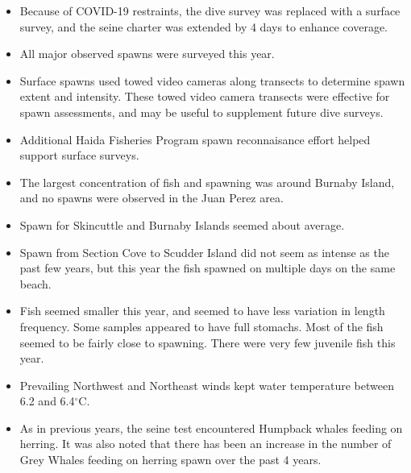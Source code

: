 \begin{itemize}

\item Because of COVID-19 restraints, the dive survey was replaced with a surface survey, and the seine charter was extended by 4 days to enhance coverage.

\item All major observed spawns were surveyed this year.

\item Surface spawns used towed video cameras along transects to determine spawn extent and intensity.
These towed video camera transects were effective for spawn assessments, and may be useful to supplement future dive surveys.

\item Additional Haida Fisheries Program spawn reconnaisance effort helped support surface surveys.

\item The largest concentration of fish and spawning was around Burnaby Island, and no spawns were observed in the Juan Perez area.

\item Spawn for Skincuttle and Burnaby Islands seemed about average.

\item Spawn from Section Cove to Scudder Island did not seem as intense as the past few years, but this year the fish spawned on multiple days on the same beach.

\item Fish seemed smaller this year, and seemed to have less variation in length frequency.
Some samples appeared to have full stomachs.
Most of the fish seemed to be fairly close to spawning.
There were very few juvenile fish this year.

\item Prevailing Northwest and Northeast winds kept water temperature between 6.2 and 6.4$^\circ\text{C}$.

\item As in previous years, the seine test encountered Humpback whales feeding on herring.
It was also noted that there has been an increase in the number of Grey Whales feeding on herring spawn over the past 4 years.

\end{itemize}
